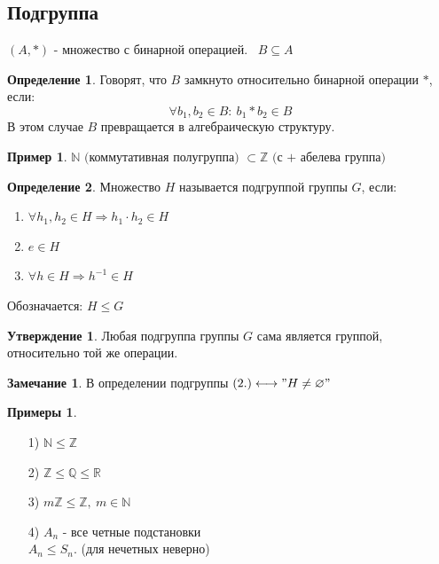 \documentclass[a4paper, 12pt]{article}
\newcommand{\R}{\mathbb R}
\newcommand{\Q}{\mathbb Q}
\newcommand{\Z}{\mathbb Z}
\newcommand{\N}{\mathbb N}
\newcommand\tab[1][.5cm]{\hspace*{#1}}
\theoremstyle{definition}
\newtheorem*{definition}{Определение}
\newtheorem*{subtheorem}{Утверждение}
\newtheorem*{remark}{Замечание}
\newtheorem*{example}{Примеры}
\newtheorem*{example1}{Пример}
\begin{document}
  \subsection{Подгруппа}
  $(A,*)$ - множество с бинарной операцией. \ $B \subseteq A$ 
  \begin{definition}
    Говорят, что $B$ замкнуто относительно бинарной операции $*$, если: $$\forall b_1,b_2 \in B: \ b_1 * b_2 \in B$$
    В этом случае $B$ превращается в алгебраическую структуру.   
  \end{definition}  
  \begin{example1}
    $\N \text{ (коммутативная полугруппа) }  \subset \Z \text{ (с + абелева группа) }$ 
  \end{example1}
  \begin{definition}
    Множество $H$ называется подгруппой группы $G$, если:
    \begin{enumerate}
      \item $\forall h_1,h_2 \in H \Longrightarrow h_1 \cdot h_2 \in H$ 
      \item $e \in H$
      \item $\forall h \in H \Longrightarrow h^{-1} \in H$  
    \end{enumerate}
    Обозначается: $H \leq G$ 
  \end{definition} 
  \begin{subtheorem}
    Любая подгруппа группы $G$ сама является группой, относительно той же операции.
  \end{subtheorem} 
  \begin{remark}
    В определении подгруппы $(2.) \longleftrightarrow "H \neq \varnothing"$ 
  \end{remark} 
  \begin{example}\tab
    \begin{itemize}
      \item[1)] $\N\leq \Z$
      \item[2)] $\Z \leq \Q \leq \R$
      \item[3)] $m\Z \leq\Z, \ m\in \N$   
      \item[4)] $A_n$ - все четные подстановки\\
      $A_n \leq S_n$. (для нечетных неверно)    
    \end{itemize}
  \end{example}
\end{document}
